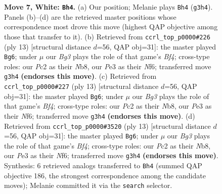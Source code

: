 \documentclass[11pt]{article}
\begin{document}
\begin{figure}[p]
\caption{\textbf{Move 7, White: \texttt{Bh4}.} (a) Our position; Melanie plays \texttt{Bh4} (\texttt{g3h4}). Panels (b)--(d) are the retrieved master positions whose correspondence most drove this move (highest QAP objective among those that transfer to it). (b) Retrieved from \texttt{ccrl\_top\_p0000\#226} (ply 13) [structural distance $d$=56, QAP obj=31]: the master played \texttt{Bg6}; under $\mu$ our \emph{Bg3} plays the role of that game's \emph{Bf4}; cross-type roles: our \emph{P}c2 as their \emph{N}b8, our \emph{P}e3 as their \emph{N}f6; transferred move \texttt{g3h4} \textbf{(endorses this move)}. (c) Retrieved from \texttt{ccrl\_top\_p0000\#227} (ply 13) [structural distance $d$=56, QAP obj=31]: the master played \texttt{Bg6}; under $\mu$ our \emph{Bg3} plays the role of that game's \emph{Bf4}; cross-type roles: our \emph{P}c2 as their \emph{N}b8, our \emph{P}e3 as their \emph{N}f6; transferred move \texttt{g3h4} \textbf{(endorses this move)}. (d) Retrieved from \texttt{ccrl\_top\_p0000\#3520} (ply 13) [structural distance $d$=56, QAP obj=31]: the master played \texttt{Bg6}; under $\mu$ our \emph{Bg3} plays the role of that game's \emph{Bf4}; cross-type roles: our \emph{P}c2 as their \emph{N}b8, our \emph{P}e3 as their \emph{N}f6; transferred move \texttt{g3h4} \textbf{(endorses this move)}. Synthesis: 6 retrieved analogs transferred to \texttt{Bh4} (summed QAP objective 186, the strongest correspondence among the candidate moves); Melanie committed it via the \texttt{search} selector.}
\label{fig:thought-m12}
\end{figure}

\clearpage
\end{document}
